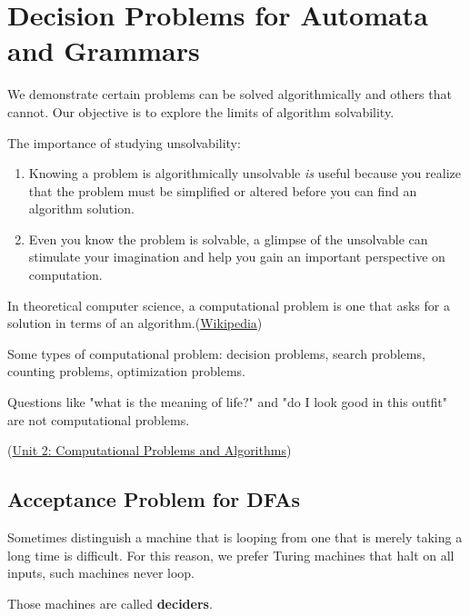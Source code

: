 \chapter{Decision Problems for Automata and Grammars}

We demonstrate certain problems can be solved algorithmically and others that cannot. Our objective is to explore the limits of algorithm solvability.

The importance of studying unsolvability:
\begin{enumerate}
    \item Knowing a problem is algorithmically unsolvable \textit{is} useful because you realize that the problem must be simplified or altered before you can find an algorithm solution.
    \item Even you know the problem is solvable, a glimpse of the unsolvable can stimulate your imagination and help you gain an important perspective on computation.
\end{enumerate}

\begin{remark}
    In theoretical computer science, a computational problem is one that asks for a solution in terms of an algorithm.(\href{https://en.wikipedia.org/wiki/Computational_problem}{Wikipedia})
\end{remark}

\begin{example}
    Some types of computational problem: decision problems, search problems, counting problems, optimization problems.

    Questions like "what is the meaning of life?" and "do I look good in this outfit" are not computational problems.

    (\href{https://nus-cs1010.github.io/1819-s1/02-algo.html}{Unit 2: Computational Problems and Algorithms})
\end{example}


\section{Acceptance Problem for DFAs}
\begin{remark}
    Sometimes distinguish a machine that is looping from one that is merely taking a long time is difficult. For this reason, we prefer Turing machines that halt on all inputs, such machines never loop.

    Those machines are called \textbf{deciders}. 
\end{remark}

